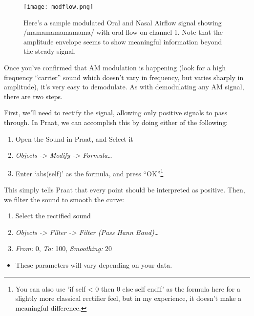 \begin{figure}
  \centerline{
    \mbox{\texttt{[image: modflow.png]}}
  }
  \caption{Here's a sample modulated Oral and Nasal Airflow signal showing /mamamamamamama/ with oral flow on channel 1.  Note that the amplitude envelope seems to show meaningful information beyond the steady signal.}
  
  \end{figure}

Once you've confirmed that AM modulation is happening (look for a high
frequency ``carrier'' sound which doesn't vary in frequency, but varies
sharply in amplitude), it's very easy to demodulate. As with
demodulating any AM signal, there are two steps.

First, we'll need to rectify the signal, allowing only positive signals
to pass through. In Praat, we can accomplish this by doing either of the
following:

\begin{enumerate}
\def\labelenumi{\arabic{enumi}.}
\tightlist
\item
  Open the Sound in Praat, and Select it
\item
  \emph{Objects -\textgreater{} Modify -\textgreater{} Formula\ldots{}}
\item
  Enter `abs(self)' as the formula, and press
  ``OK''\footnote{You can also use 'if self < 0 then 0 else self endif' as the formula here for a slightly more classical rectifier feel, but in my experience, it doesn't make a meaningful difference.}
\end{enumerate}

This simply tells Praat that every point should be interpreted as
positive. Then, we filter the sound to smooth the curve:

\begin{enumerate}
\def\labelenumi{\arabic{enumi}.}
\tightlist
\item
  Select the rectified sound
\item
  \emph{Objects -\textgreater{} Filter -\textgreater{} Filter (Pass Hann
  Band)\ldots{}}
\item
  \emph{From:} 0, \emph{To:} 100, \emph{Smoothing:} 20
\end{enumerate}

\begin{itemize}
\tightlist
\item
  These parameters will vary depending on your data.
\end{itemize}

